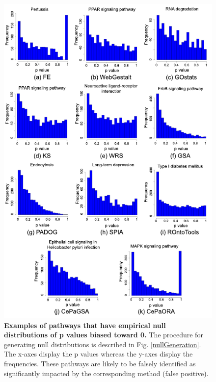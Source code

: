 \documentclass[Minh_PhD_thesis.tex]{subfiles}
\begin{document}
\begin{figure}
\centering

	\includegraphics[width=0.8\linewidth]{../Figures/Biased0}
	\caption{\textbf{Examples of pathways that have empirical null distributions of p values biased toward 0.} The procedure for generating null distributions is described in Fig. \ref{nullGeneration}. The x-axes display the p values whereas the y-axes display the frequencies. These pathways are likely to be falsely identified as significantly impacted by the corresponding method (false positive).}\label{fig:Biased0}
\end{figure}
\end{document}
